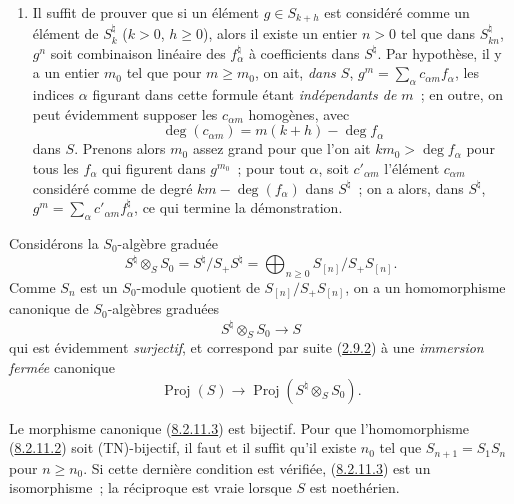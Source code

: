 \begin{enumerate}
\item[\rm(iv)] Il suffit de prouver que si un élément $g\in S_{k+h}$ est
considéré comme un élément de $S_k^\natural$ ($k>0$, $h\geq0$), alors il
existe un entier $n>0$ tel que dans $S_{kn}^\natural$, $g^n$ soit combinaison
linéaire des $f_\alpha^\natural$ à coefficients dans $S^\natural$. Par
hypothèse, il y a un entier $m_0$ tel que pour $m\geq m_0$, on ait, \emph{dans
$S$}, $g^m=\sum_\alpha c_{\alpha m}f_\alpha$, les indices $\alpha$ figurant
dans cette formule étant \emph{indépendants de $m$}~; en outre, on peut
évidemment supposer les $c_{\alpha m}$ homogènes, avec
\[
  \deg(c_{\alpha m})=m(k+h)-\deg f_\alpha
\]
dans $S$. Prenons alors $m_0$ assez grand pour que l'on ait
$km_0>\deg f_\alpha$ pour tous les $f_\alpha$ qui figurent dans $g^{m_0}$~;
pour tout $\alpha$, soit $c'_{\alpha m}$ l'élément $c_{\alpha m}$ considéré
comme de degré $km-\deg(f_\alpha)$ dans $S^\natural$~; on a alors, dans
$S^\natural$, $g^m=\sum_\alpha c'_{\alpha m}f_\alpha^\natural$, ce qui
termine la démonstration.
\end{enumerate}

\begin{env}[8.2.11]
\label{II.8.2.11-fr}
Considérons la $S_0$-algèbre graduée
\begin{equation}
\label{II.8.2.11.1-fr}
  S^\natural\otimes_S S_0=S^\natural/S_+S^\natural
  =\bigoplus_{n\geq0}S_{[n]}/S_+S_{[n]}.
\tag{8.2.11.1}
\end{equation}
Comme $S_n$ est un $S_0$-module quotient de $S_{[n]}/S_+S_{[n]}$, on a un
homomorphisme canonique de $S_0$-algèbres graduées
\begin{equation}
\label{II.8.2.11.2-fr}
  S^\natural\otimes_S S_0\to S
\tag{8.2.11.2}
\end{equation}
qui est évidemment \emph{surjectif}, et correspond par suite
(\hyperref[II.2.9.2-fr]{2.9.2}) à une \emph{immersion fermée} canonique
\begin{equation}
\label{II.8.2.11.3-fr}
  \operatorname{Proj}(S)\to
  \operatorname{Proj}(S^\natural\otimes_S S_0).
\tag{8.2.11.3}
\end{equation}
\end{env}


\begin{proposition}[8.2.12]
\label{II.8.2.12-fr}
Le morphisme canonique (\hyperref[II.8.2.11.3-fr]{8.2.11.3}) est bijectif.
Pour que l'homomorphisme (\hyperref[II.8.2.11.2-fr]{8.2.11.2}) soit
(TN)-bijectif, il faut et il suffit qu'il existe $n_0$ tel que
$S_{n+1}=S_1S_n$ pour $n\geq n_0$. Si cette dernière condition est vérifiée,
(\hyperref[II.8.2.11.3-fr]{8.2.11.3}) est un isomorphisme~; la réciproque est
vraie lorsque $S$ est noethérien.
\end{proposition}

